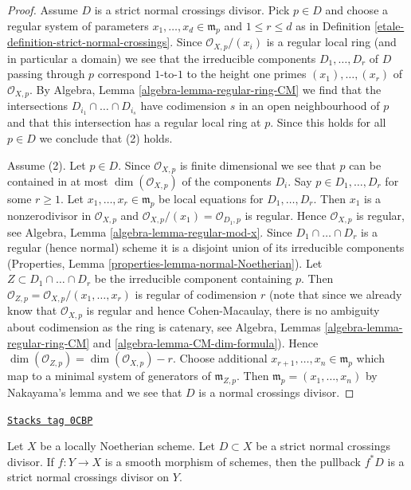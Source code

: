 \begin{proof}

Assume $D$ is a strict normal crossings divisor. Pick $p \in D$
and choose a regular system of parameters $x_1, \ldots, x_d \in \mathfrak m_p$
and $1 \leq r \leq d$ as in
Definition \ref{etale-definition-strict-normal-crossings}.
Since $\mathcal{O}_{X, p}/(x_i)$ is a regular local ring
(and in particular a domain) we see that the irreducible components
$D_1, \ldots, D_r$ of $D$ passing through $p$ correspond $1$-to-$1$
to the height one primes $(x_1), \ldots, (x_r)$ of $\mathcal{O}_{X, p}$.
By Algebra, Lemma \ref{algebra-lemma-regular-ring-CM}
we find that the intersections $D_{i_1} \cap \ldots \cap D_{i_s}$
have codimension $s$ in an open neighbourhood of $p$
and that this intersection has a regular local ring at $p$.
Since this holds for all $p \in D$ we conclude that (2) holds.

\medskip\noindent
Assume (2). Let $p \in D$. Since $\mathcal{O}_{X, p}$ is finite
dimensional we see that $p$ can be contained in at most
$\dim(\mathcal{O}_{X, p})$ of the components $D_i$.
Say $p \in D_1, \ldots, D_r$ for some $r \geq 1$.
Let $x_1, \ldots, x_r \in \mathfrak m_p$ be local equations
for $D_1, \ldots, D_r$. Then $x_1$ is a nonzerodivisor in $\mathcal{O}_{X, p}$
and $\mathcal{O}_{X, p}/(x_1) = \mathcal{O}_{D_1, p}$ is regular.
Hence $\mathcal{O}_{X, p}$ is regular, see
Algebra, Lemma \ref{algebra-lemma-regular-mod-x}.
Since $D_1 \cap \ldots \cap D_r$ is a regular (hence normal) scheme
it is a disjoint union of its irreducible components
(Properties, Lemma \ref{properties-lemma-normal-Noetherian}).
Let $Z \subset D_1 \cap \ldots \cap D_r$
be the irreducible component containing $p$.
Then $\mathcal{O}_{Z, p} = \mathcal{O}_{X, p}/(x_1, \ldots, x_r)$
is regular of codimension $r$ (note that since we already know
that $\mathcal{O}_{X, p}$ is regular and hence Cohen-Macaulay,
there is no ambiguity about codimension as the ring is catenary, see
Algebra, Lemmas \ref{algebra-lemma-regular-ring-CM} and
\ref{algebra-lemma-CM-dim-formula}).
Hence $\dim(\mathcal{O}_{Z, p}) = \dim(\mathcal{O}_{X, p}) - r$.
Choose additional $x_{r + 1}, \ldots, x_n \in \mathfrak m_p$
which map to a minimal system of generators of $\mathfrak m_{Z, p}$.
Then $\mathfrak m_p = (x_1, \ldots, x_n)$ by Nakayama's lemma
and we see that $D$ is a normal crossings divisor.
\end{proof}

\begin{lemma}
\label{etale-lemma-smooth-pullback-strict-normal-crossings}
\href{https://stacks.math.columbia.edu/tag/0CBP}{\texttt{Stacks tag 0CBP}}


Let $X$ be a locally Noetherian scheme. Let $D \subset X$ be a
strict normal crossings divisor. If $f : Y \to X$ is a smooth
morphism of schemes, then the pullback $f^*D$ is a
strict normal crossings divisor on $Y$.
\end{lemma}

